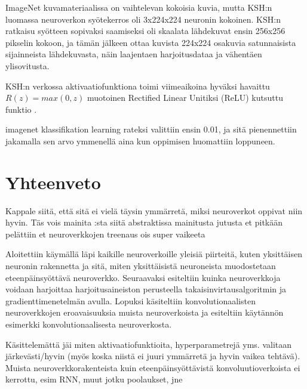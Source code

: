 \documentclass[finnish]{tktltiki2}
\theoremstyle{definition}
\theoremstyle{remark}
\begin{document}
    ImageNet kuvamateriaalissa on vaihtelevan kokoisia kuvia, mutta KSH:n luomassa neuroverkon syötekerros oli 3x224x224 neuronin kokoinen. KSH:n ratkaisu syötteen sopivaksi saamiseksi oli skaalata lähdekuvat ensin 256x256 pikselin kokoon, ja tämän jälkeen ottaa kuvista 224x224 osakuvia satunnaisista sijainneista lähdekuvasta, näin laajentaen harjoitusdataa ja vähentäen ylisovitusta.
    
    KSH:n verkossa aktivaatiofunktiona toimi viimeaikoina hyväksi havaittu $R(z) = max(0, z)$ muotoinen Rectified Linear Unitiksi (ReLU) kutsuttu funktio \cite{KSHimagenet2012}.

  imagenet klassifikation \cite{KSHimagenet2012} learning rateksi valittiin ensin 0.01, ja sitä pienennettiin jakamalla sen arvo ymmenellä aina kun oppimisen huomattiin loppuneen.



\section{Yhteenveto} 

Kappale siitä, että sitä ei vielä täysin ymmärretä, miksi neuroverkot oppivat niin hyvin. Täs vois mainita \cite{neural-optimization-goodfellow-2015} :sta siitä abstraktissa mainitusta jutusta et pitkään pelättiin et neuroverkkojen treenaus ois super vaikeeta 

Aloitettiin käymällä läpi kaikille neuroverkoille yleisiä piirteitä, kuten yksittäisen neuronin rakennetta ja sitä, miten yksittäisistä neuroneista muodostetaan eteenpäinsyöttävä neuroverkko. Seuraavaksi esiteltiin kuinka neuroverkkoja voidaan harjoittaa harjoitusaineiston perusteella takaisinvirtausalgoritmin ja gradienttimenetelmän avulla. Lopuksi käsiteltiin konvolutionaalisten neuroverkkojen eroavaisuuksia muista neuroverkoista ja esiteltiin käytännön esimerkki konvolutionaalisesta neuroverkosta.

Käsittelemättä jäi miten aktivaatiofunktioita, hyperparametrejä yms. valitaan järkevästi/hyvin (myös koska niistä ei juuri ymmärretä ja hyvin vaikea tehtävä). Muista neuroverkkorakenteista kuin eteenpäinsyöttävistä konvoluutioverkoista ei kerrottu, esim RNN, muut jotku poolaukset, jne
\end{document}

